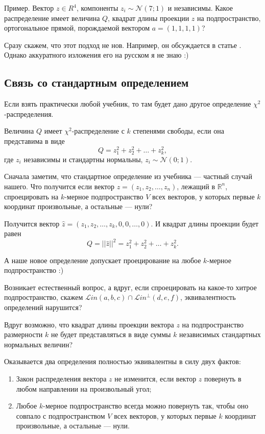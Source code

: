 \documentclass[11pt,russian,]{article}
\newcommand{\cN}{\mathcal{N}}
\newcommand{\RR}{\mathbb{R}}
\renewcommand{\Rn}{\RR^n}
\newcommand{\1}{\mathbbm{1}}
\newcommand{\Lin}{\mathcal{L}in}
\newcommand{\Linp}{\Lin^{\perp}}
\begin{document}
Пример. Вектор \(z \in R^4\), компоненты \(z_i \sim \cN(7;1)\) и
независимы. Какое распределение имеет величина \(Q\), квадрат длины
проекции \(z\) на подпространство, ортогональное прямой, порождаемой
вектором \(a=(1, 1, 1, 1)\)?

Сразу скажем, что этот подход не нов. Например, он обсуждается в статье
\textcite{cobb2011teaching}. Однако аккуратного изложения его на русском
я не знаю :)

\subsection{Связь со стандартным определением}\label{---}

Если взять практически любой учебник, то там будет дано другое
определение \(\chi^2\)-распределения.

Величина \(Q\) имеет \(\chi^2\)-распределение с \(k\) степенями свободы,
если она представима в виде \[
Q = z_1^2 + z_2^2 + \ldots + z_k^2,
\] где \(z_i\) независимы и стандартны нормальны, \(z_i \sim \cN(0;1)\).

Сначала заметим, что стандартное определение из учебника --- частный
случай нашего. Что получится если вектор
\(z = (z_1, z_2, \ldots, z_n)\), лежащий в \(\Rn\), спроецировать на
\(k\)-мерное подпространство \(V\) всех векторов, у которых первые \(k\)
координат произвольные, а остальные --- нули?

Получится вектор \(\hat z = (z_1, z_2, \ldots, z_k, 0, 0, \ldots, 0)\).
И квадрат длины проекции будет равен \[
Q = ||\hat z||^2 = z_1^2 + z_2^2 + \ldots + z_k^2.
\]

А наше новое определение допускает проецирование на любое \(k\)-мерное
подпространство :)

Возникает естественный вопрос, а вдруг, если спроецировать на какое-то
хитрое подпространство, скажем \(\Lin(a, b, c) \cap \Linp (d, e, f)\),
эквивалентность определений нарушится?

Вдруг возможно, что квадрат длины проекции вектора \(z\) на
подпространство размерности \(k\) не будет представляться в виде суммы
\(k\) независимых стандартных нормальных величин?

Оказывается два определения полностью эквивалентны в силу двух фактов:

\begin{enumerate}
\def\labelenumi{\arabic{enumi}.}
\item
  Закон распределения вектора \(z\) не изменится, если вектор \(z\)
  повернуть в любом направлении на произвольный угол;
\item
  Любое \(k\)-мерное подпространство всегда можно повернуть так, чтобы
  оно совпало с подпространством \(V\) всех векторов, у которых первые
  \(k\) координат произвольные, а остальные --- нули.
\end{enumerate}
\end{document}
